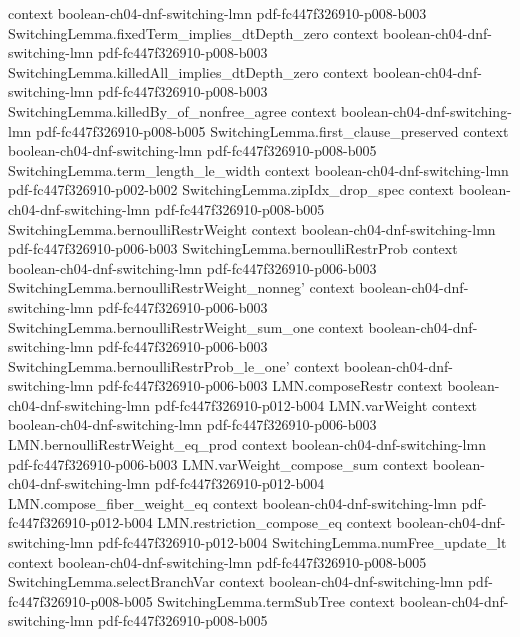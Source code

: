 \begin{lemma}
  {context}
  {boolean-ch04-dnf-switching-lmn}
  {pdf-fc447f326910-p008-b003}
\proofstep
  {SwitchingLemma.fixedTerm_implies_dtDepth_zero}
  {context}
  {boolean-ch04-dnf-switching-lmn}
  {pdf-fc447f326910-p008-b003}
\proofstep
  {SwitchingLemma.killedAll_implies_dtDepth_zero}
  {context}
  {boolean-ch04-dnf-switching-lmn}
  {pdf-fc447f326910-p008-b003}
\proofstep
  {SwitchingLemma.killedBy_of_nonfree_agree}
  {context}
  {boolean-ch04-dnf-switching-lmn}
  {pdf-fc447f326910-p008-b005}
\proofstep
  {SwitchingLemma.first_clause_preserved}
  {context}
  {boolean-ch04-dnf-switching-lmn}
  {pdf-fc447f326910-p008-b005}
\proofstep
  {SwitchingLemma.term_length_le_width}
  {context}
  {boolean-ch04-dnf-switching-lmn}
  {pdf-fc447f326910-p002-b002}
\proofstep
  {SwitchingLemma.zipIdx_drop_spec}
  {context}
  {boolean-ch04-dnf-switching-lmn}
  {pdf-fc447f326910-p008-b005}
\proofstep
  {SwitchingLemma.bernoulliRestrWeight}
  {context}
  {boolean-ch04-dnf-switching-lmn}
  {pdf-fc447f326910-p006-b003}
\proofstep
  {SwitchingLemma.bernoulliRestrProb}
  {context}
  {boolean-ch04-dnf-switching-lmn}
  {pdf-fc447f326910-p006-b003}
\proofstep
  {SwitchingLemma.bernoulliRestrWeight_nonneg'}
  {context}
  {boolean-ch04-dnf-switching-lmn}
  {pdf-fc447f326910-p006-b003}
\proofstep
  {SwitchingLemma.bernoulliRestrWeight_sum_one}
  {context}
  {boolean-ch04-dnf-switching-lmn}
  {pdf-fc447f326910-p006-b003}
\proofstep
  {SwitchingLemma.bernoulliRestrProb_le_one'}
  {context}
  {boolean-ch04-dnf-switching-lmn}
  {pdf-fc447f326910-p006-b003}
\proofstep
  {LMN.composeRestr}
  {context}
  {boolean-ch04-dnf-switching-lmn}
  {pdf-fc447f326910-p012-b004}
\proofstep
  {LMN.varWeight}
  {context}
  {boolean-ch04-dnf-switching-lmn}
  {pdf-fc447f326910-p006-b003}
\proofstep
  {LMN.bernoulliRestrWeight_eq_prod}
  {context}
  {boolean-ch04-dnf-switching-lmn}
  {pdf-fc447f326910-p006-b003}
\proofstep
  {LMN.varWeight_compose_sum}
  {context}
  {boolean-ch04-dnf-switching-lmn}
  {pdf-fc447f326910-p012-b004}
\proofstep
  {LMN.compose_fiber_weight_eq}
  {context}
  {boolean-ch04-dnf-switching-lmn}
  {pdf-fc447f326910-p012-b004}
\proofstep
  {LMN.restriction_compose_eq}
  {context}
  {boolean-ch04-dnf-switching-lmn}
  {pdf-fc447f326910-p012-b004}
\proofstep
  {SwitchingLemma.numFree_update_lt}
  {context}
  {boolean-ch04-dnf-switching-lmn}
  {pdf-fc447f326910-p008-b005}
\proofstep
  {SwitchingLemma.selectBranchVar}
  {context}
  {boolean-ch04-dnf-switching-lmn}
  {pdf-fc447f326910-p008-b005}
\proofstep
  {SwitchingLemma.termSubTree}
  {context}
  {boolean-ch04-dnf-switching-lmn}
  {pdf-fc447f326910-p008-b005}

\end{lemma}
